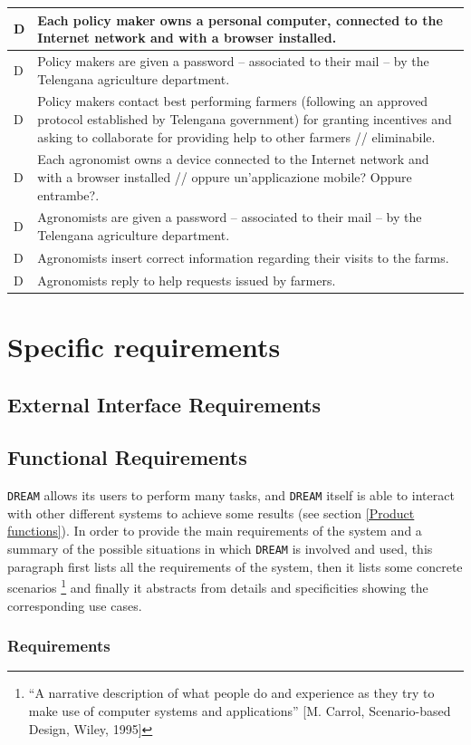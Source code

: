 \documentclass{article}
\begin{document}
\begin{longtable}[c]{|m{0.75cm}|m{11cm}|}
  \hline
  D & Each policy maker owns a personal computer, connected to the Internet network and with a browser installed.\\
  \hline
  D & Policy makers are given a password – associated to their mail – by the Telengana agriculture department.\\
  \hline
  D & Policy makers contact best performing farmers (following an approved protocol established by Telengana government) for granting incentives and asking to collaborate for providing help to other farmers // eliminabile.\\
  \hline
  D & Each agronomist owns a device connected to the Internet network and with a browser installed // oppure un’applicazione mobile? Oppure entrambe?.\\
  \hline
  D & Agronomists are given a password – associated to their mail – by the Telengana agriculture department.\\
  \hline
  D & Agronomists insert correct information regarding their visits to the farms.\\
  \hline
  D & Agronomists reply to help requests issued by farmers.\\
  \hline
  \end{longtable}
\section{Specific requirements}
\subsection{External Interface Requirements}
\subsection{Functional Requirements}
\verb |DREAM| allows its users to perform many tasks, and \verb |DREAM| itself is able to interact with other different systems to achieve some results (see section \ref{Product functions}). In order to provide the main requirements of the system and a summary of the possible situations in which \verb |DREAM| is involved and used, this paragraph first lists all the requirements of the system, then it lists some concrete scenarios \footnote{“A narrative description of what people do and experience as
they try to make use of computer systems and applications” [M.
Carrol, Scenario-based Design, Wiley, 1995]} and finally it abstracts from details and specificities showing the corresponding use cases.
\subsubsection{Requirements}
\end{document}
